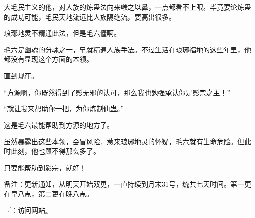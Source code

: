 \begin{this_body}
大毛民主义的他，对人族的炼蛊法向来嗤之以鼻，一点都看不上眼。毕竟要论炼蛊的成功可能，毛民天地流远比人族隔绝流，要高出很多。

琅琊地灵不精通此法，但是毛六懂啊。

毛六是幽魂的分魂之一，早就精通人族手法。不过生活在琅琊福地的这些年里，他都没有显现这个方面的本领。

直到现在。

“方源啊，你既然得到了影无邪的认可，那么我也勉强承认你是影宗之主！”

“就让我来帮助你一把，为你炼制仙蛊。”

这是毛六最能帮助到方源的地方了。

虽然暴露出这些本领，会冒风险，惹来琅琊地灵的怀疑，毛六就有生命危险。但此时此刻，他也顾不得那么多了。

只要能帮助到影宗，就好！

备注：更新通知，从明天开始双更，一直持续到月末31号，统共七天时间。第一更在早八点，第二更在晚八点。

『：访问网站』

\end{this_body}

